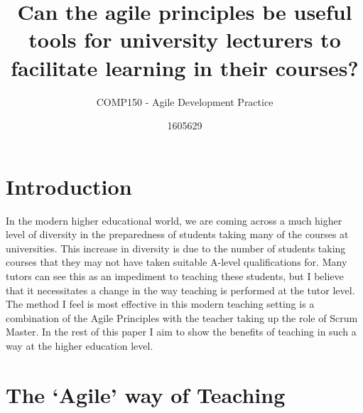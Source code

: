 \documentclass{scrartcl}
\title{Can the agile principles be useful tools for university lecturers to facilitate learning in their courses?}
\subtitle{COMP150 - Agile Development Practice}
\author{1605629}
\begin{document}
\maketitle


\section{Introduction}

In the modern higher educational world, we are coming across a much higher level of diversity in the preparedness of students taking many of the courses at universities. This increase in diversity is due to the number of students taking courses that they may not have taken suitable A-level qualifications for. Many tutors can see this as an impediment to teaching these students, but I believe that it necessitates a change in the way teaching is performed at the tutor level. The method I feel is most effective in this modern teaching setting is a combination of the Agile Principles with the teacher taking up the role of Scrum Master. In the rest of this paper I aim to show the benefits of teaching in such a way at the higher education level.

\section{The ‘Agile’ way of Teaching}
\end{document}
